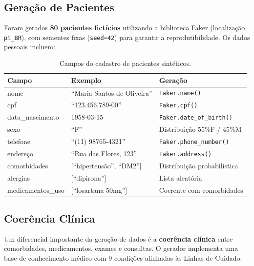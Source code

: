 \subsection{Geração de Pacientes}

Foram gerados \textbf{80 pacientes fictícios} utilizando a biblioteca Faker (localização \texttt{pt\_BR}), com sementes fixas (\texttt{seed=42}) para garantir a reprodutibilidade. Os dados pessoais incluem:

\begin{table}[H]
\centering
\caption{Campos do cadastro de pacientes sintéticos.}
\label{tab:campos_pacientes}
\begin{tabularx}{\textwidth}{l l X}
\toprule
\textbf{Campo} & \textbf{Exemplo} & \textbf{Geração} \\
\midrule
nome              & ``Maria Santos de Oliveira'' & \texttt{Faker.name()} \\
cpf               & ``123.456.789-00''           & \texttt{Faker.cpf()} \\
data\_nascimento  & 1958-03-15                   & \texttt{Faker.date\_of\_birth()} \\
sexo              & ``F''                        & Distribuição 55\%F / 45\%M \\
telefone          & ``(11) 98765-4321''          & \texttt{Faker.phone\_number()} \\
endereço          & ``Rua das Flores, 123''      & \texttt{Faker.address()} \\
comorbidades      & [``hipertensão'', ``DM2'']   & Distribuição probabilística \\
alergias          & [``dipirona'']               & Lista aleatória \\
medicamentos\_uso & [``losartana 50mg'']         & Coerente com comorbidades \\
\bottomrule
\end{tabularx}
\end{table}

\subsection{Coerência Clínica}

Um diferencial importante da geração de dados é a \textbf{coerência clínica} entre comorbidades, medicamentos, exames e consultas. O gerador implementa uma base de conhecimento médico com 9 condições alinhadas às Linhas de Cuidado:

